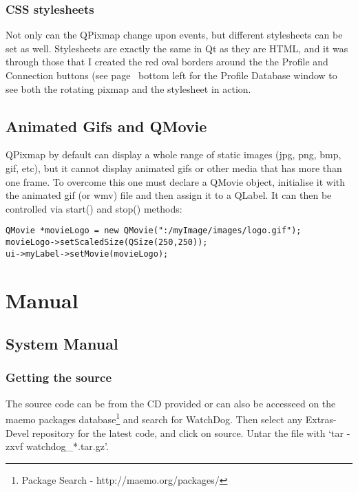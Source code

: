 \subsubsection{CSS stylesheets}
Not only can the QPixmap change upon events, but different stylesheets can be set as well. Stylesheets are exactly the same in Qt as they are HTML, and it was through those that I created the red oval borders around the the Profile and Connection buttons (see page~\pageref{guimap} bottom left for the Profile Database window to see both the rotating pixmap and the stylesheet in action.

\subsection{Animated Gifs and QMovie}
QPixmap by default can display a whole range of static images (jpg, png, bmp, gif, etc), but it cannot display animated gifs or other media that has more than one frame. To overcome this one must declare a QMovie object, initialise it with the animated gif (or wmv) file and then assign it to a QLabel. It can then be controlled via start() and stop() methods:
\begin{lstlisting}
QMovie *movieLogo = new QMovie(":/myImage/images/logo.gif");
movieLogo->setScaledSize(QSize(250,250));
ui->myLabel->setMovie(movieLogo);
\end{lstlisting}

\section{Manual}
\subsection{System Manual}
\subsubsection{Getting the source}
The source code can be from the CD provided or can also be accesseed on the maemo packages database\footnote{Package Search - http://maemo.org/packages/} and search for WatchDog. Then select any Extras-Devel repository for the latest code, and click on source. Untar the file with ‘tar -zxvf  watchdog\_*.tar.gz’.
